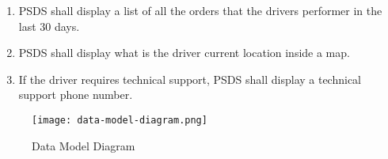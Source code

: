 \pagebreak
\begin{enumerate}[resume, label=SY-\arabic*]
    \item  PSDS shall display a list of all the orders that the drivers 
    performer in the last 30 days.
    \item  PSDS shall display what is the driver current location inside a map.
    \item  If the driver requires technical support, PSDS shall display a 
    technical support phone number.
\end{enumerate}

\begin{figure}[!htb]
    \centering
    \texttt{[image: data-model-diagram.png]}
    \caption{Data Model Diagram}
\end{figure}
